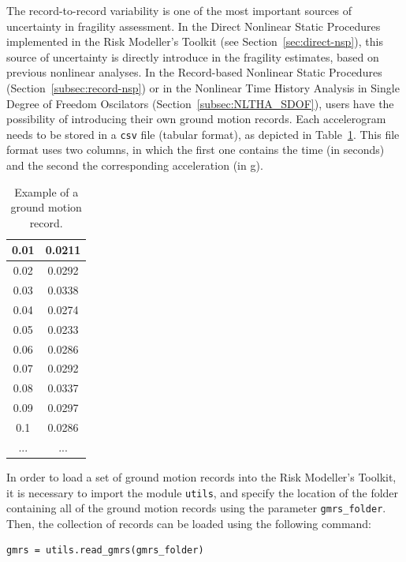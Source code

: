The record-to-record variability is one of the most important sources of uncertainty in fragility assessment. In the Direct Nonlinear Static Procedures implemented in the Risk Modeller's Toolkit (see Section~\ref{sec:direct-nsp}), this source of uncertainty is directly introduce in the fragility estimates, based on previous nonlinear analyses. In the Record-based Nonlinear Static Procedures (Section~\ref{subsec:record-nsp}) or in the Nonlinear Time History Analysis in Single Degree of Freedom Oscilators (Section~\ref{subsec:NLTHA_SDOF}), users have the possibility of introducing their own ground motion records. Each accelerogram needs to be stored in a \verb=csv= file (tabular format), as depicted in Table~\ref{table:gmr}. This file format uses two columns, in which the first one contains the time (in seconds) and the second the corresponding acceleration (in g).\\

\begin {table}[htb]
\caption{Example of a ground motion record.}
\label{table:gmr}
\begin{center}
  \begin{tabular}{ | c | c |}
  \hline
0.01 & 0.0211 \\ \hline
0.02 & 0.0292 \\ \hline
0.03 & 0.0338 \\ \hline
0.04 & 0.0274 \\ \hline
0.05 & 0.0233 \\ \hline
0.06 & 0.0286 \\ \hline
0.07 & 0.0292 \\ \hline
0.08 & 0.0337 \\ \hline
0.09 & 0.0297 \\ \hline
0.1 & 0.0286 \\ \hline
... & ...  \\ \hline
  \end{tabular}
\end{center}
\end{table}

In order to load a set of ground motion records into the Risk Modeller's Toolkit, it is necessary to import the module \verb=utils=, and specify the location of the folder containing all of the ground motion records using the parameter \verb=gmrs_folder=. Then, the collection of records can be loaded using the following command:

\begin{Verbatim}[frame=single, commandchars=\\\{\}, samepage=true]
gmrs = utils.read_gmrs(gmrs_folder)
\end{Verbatim}

